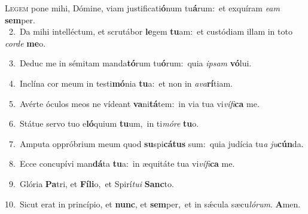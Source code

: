\lettrine{\initial\textcolor{\initialcolor}{L}}{egem} pone mihi, Dómine, viam justificati\-\textbf{ó}\-num tu\-\textbf{á}\-rum:~\star et exquíram \textit{e}\-\textit{am} \textbf{sem}\-per.\\
{\numbfont\textcolor{\numbcolor}{~2.}}~Da mihi intelléctum, et scrutábor \textbf{le}\-gem \textbf{tu}\-am:~\star et custódiam illam in toto \textit{cor}\-\textit{de} \textbf{me}\-o.\par
{\numbfont\textcolor{\numbcolor}{~3.}}~Deduc me in sémitam manda\-\textbf{tó}\-rum tu\-\textbf{ó}\-rum:~\star quia \textit{ip}\-\textit{sam} \textbf{vó}\-lui.\par
{\numbfont\textcolor{\numbcolor}{~4.}}~Inclína cor meum in testi\-\textbf{mó}\-nia \textbf{tu}\-a:~\star et non in \textit{a}\-\textit{va}\textbf{rí}tiam.\par
{\numbfont\textcolor{\numbcolor}{~5.}}~Avérte óculos meos ne vídeant \textbf{va}\-ni\-\textbf{tá}\-tem:~\star in via tua vi\-\textit{ví}\-\textit{fi}\textbf{ca} me.\par
{\numbfont\textcolor{\numbcolor}{~6.}}~Státue servo tuo e\-\textbf{ló}\-quium \textbf{tu}\-um,~\star in ti\-\textit{mó}\-\textit{re} \textbf{tu}\-o.\par
{\numbfont\textcolor{\numbcolor}{~7.}}~Amputa oppróbrium meum quod \textbf{su}\-spi\-\textbf{cá}\-\textbf{tus} sum:~\star quia judícia tu\textit{a} \textit{ju}\-\textbf{cún}da.\par
{\numbfont\textcolor{\numbcolor}{~8.}}~Ecce concupívi man\-\textbf{dá}\-ta \textbf{tu}\-a:~\star in æquitáte tua vi\-\textit{ví}\-\textit{fi}\textbf{ca} me.\par
{\numbfont\textcolor{\numbcolor}{~9.}}~Glória \textbf{Pa}\-tri, et \textbf{Fí}\-\textbf{li}o,~\star et Spirí\-\textit{tu}\-\textit{i} \textbf{Sanc}\-to.\par
{\numbfont\textcolor{\numbcolor}{10.}}~Sicut erat in princípio, et \textbf{nunc}\-, et \textbf{sem}\-per,~\star et in sǽcula sæcu\-\textit{ló}\-\textit{rum}. \textbf{A}\-men.\par
